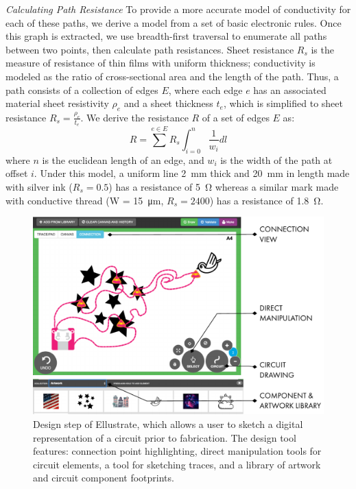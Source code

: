 \documentclass{sigchi}
\begin{document}
      
     \textit{Calculating Path Resistance} To provide a more accurate model of conductivity for each of these paths, we derive a model from a set of basic electronic rules. Once this graph is extracted, we use breadth-first traversal to enumerate all paths between two points, then calculate path resistances. Sheet resistance $R_s$ is the measure of resistance of thin films with uniform thickness; conductivity is modeled as the ratio of cross-sectional area and the length of the path. Thus, a path consists of a collection of edges $E$, where each edge $e$ has an associated material sheet resistivity $\rho_e$ and a sheet thickness $t_e$, which is simplified to sheet resistance $R_s = \frac{\rho_e}{t_e}$. We derive the resistance $R$ of a set of edges $E$ as:
        \begin{equation}
            R =  \sum^{e \in E} R_s \int_{i=0}^{n}  \frac{1}{w_i} dl
        \label{eq:resistance}
        \end{equation}
      where $n$ is the euclidean length of an edge, and $w_i$ is the width of the path at offset $i$. Under this model, a uniform line \SI{2}{\milli\metre} thick and \SI{20}{\milli\metre} in length made with silver ink ($R_s = 0.5$) has a resistance of \SI{5}{\ohm} whereas a similar mark made with conductive thread (W = \SI{15}{\micro\metre}, $R_s = 2400$) has a resistance of \SI{1.8}{\ohm}.

    \begin{figure}[t]
    \centering
    \includegraphics[width=1.0\columnwidth]{figures/designtool.pdf}
    \caption{Design step of Ellustrate, which allows a user to sketch a digital representation of a circuit prior to fabrication. The design tool features: connection point highlighting, direct manipulation tools for circuit elements, a tool for sketching traces, and a library of artwork and circuit component footprints.}
    \label{fig:design_tool}
    \vspace{-16pt}
    \end{figure}
    
\end{document}
